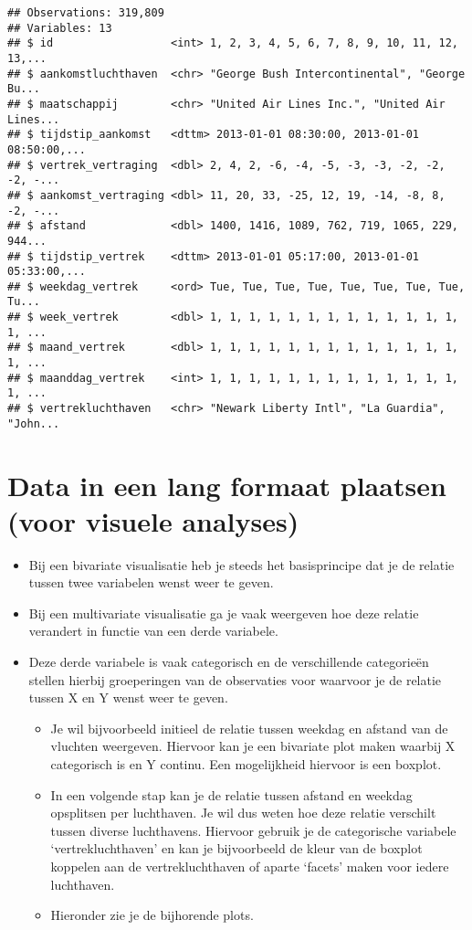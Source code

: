 \documentclass[]{memoir}
\providecommand{\tightlist}{%
  \setlength{\itemsep}{0pt}\setlength{\parskip}{0pt}}
\begin{document}
\begin{verbatim}
## Observations: 319,809
## Variables: 13
## $ id                  <int> 1, 2, 3, 4, 5, 6, 7, 8, 9, 10, 11, 12, 13,...
## $ aankomstluchthaven  <chr> "George Bush Intercontinental", "George Bu...
## $ maatschappij        <chr> "United Air Lines Inc.", "United Air Lines...
## $ tijdstip_aankomst   <dttm> 2013-01-01 08:30:00, 2013-01-01 08:50:00,...
## $ vertrek_vertraging  <dbl> 2, 4, 2, -6, -4, -5, -3, -3, -2, -2, -2, -...
## $ aankomst_vertraging <dbl> 11, 20, 33, -25, 12, 19, -14, -8, 8, -2, -...
## $ afstand             <dbl> 1400, 1416, 1089, 762, 719, 1065, 229, 944...
## $ tijdstip_vertrek    <dttm> 2013-01-01 05:17:00, 2013-01-01 05:33:00,...
## $ weekdag_vertrek     <ord> Tue, Tue, Tue, Tue, Tue, Tue, Tue, Tue, Tu...
## $ week_vertrek        <dbl> 1, 1, 1, 1, 1, 1, 1, 1, 1, 1, 1, 1, 1, 1, ...
## $ maand_vertrek       <dbl> 1, 1, 1, 1, 1, 1, 1, 1, 1, 1, 1, 1, 1, 1, ...
## $ maanddag_vertrek    <int> 1, 1, 1, 1, 1, 1, 1, 1, 1, 1, 1, 1, 1, 1, ...
## $ vertrekluchthaven   <chr> "Newark Liberty Intl", "La Guardia", "John...
\end{verbatim}

\hypertarget{data-in-een-lang-formaat-plaatsen-voor-visuele-analyses}{%
\section{Data in een lang formaat plaatsen (voor visuele analyses)}\label{data-in-een-lang-formaat-plaatsen-voor-visuele-analyses}}

\begin{itemize}
\tightlist
\item
  Bij een bivariate visualisatie heb je steeds het basisprincipe dat je de relatie tussen twee variabelen wenst weer te geven.
\item
  Bij een multivariate visualisatie ga je vaak weergeven hoe deze relatie verandert in functie van een derde variabele.
\item
  Deze derde variabele is vaak categorisch en de verschillende categorieën stellen hierbij groeperingen van de observaties voor waarvoor je de relatie tussen X en Y wenst weer te geven.

  \begin{itemize}
  \tightlist
  \item
    Je wil bijvoorbeeld initieel de relatie tussen weekdag en afstand van de vluchten weergeven. Hiervoor kan je een bivariate plot maken waarbij X categorisch is en Y continu. Een mogelijkheid hiervoor is een boxplot.
  \item
    In een volgende stap kan je de relatie tussen afstand en weekdag opsplitsen per luchthaven. Je wil dus weten hoe deze relatie verschilt tussen diverse luchthavens. Hiervoor gebruik je de categorische variabele `vertrekluchthaven' en kan je bijvoorbeeld de kleur van de boxplot koppelen aan de vertrekluchthaven of aparte `facets' maken voor iedere luchthaven.
  \item
    Hieronder zie je de bijhorende plots.
  \end{itemize}
\end{itemize}
\end{document}
